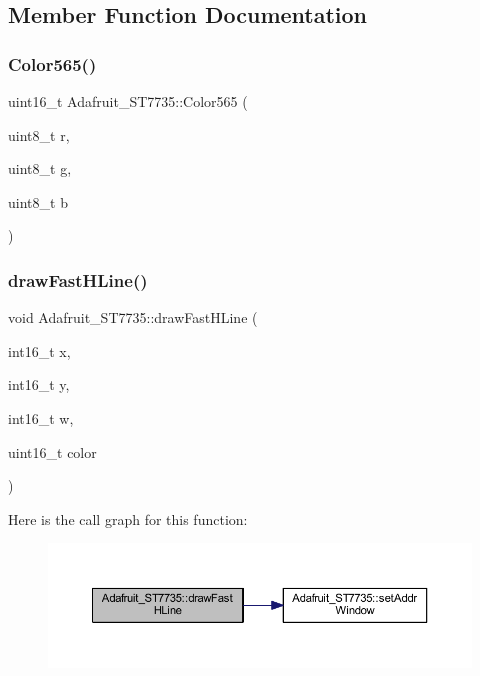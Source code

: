 \subsection{Member Function Documentation}
\mbox{\label{class_adafruit___s_t7735_aef9c4f90acb18082a51b18490feb3c0b}} 
\subsubsection{\texorpdfstring{Color565()}{Color565()}}
{\footnotesize\ttfamily uint16\+\_\+t Adafruit\+\_\+\+S\+T7735\+::\+Color565 (\begin{DoxyParamCaption}\item[{uint8\+\_\+t}]{r,  }\item[{uint8\+\_\+t}]{g,  }\item[{uint8\+\_\+t}]{b }\end{DoxyParamCaption})}

\mbox{\label{class_adafruit___s_t7735_ab2b8eb320bd19305c09b35be6d55d37e}} 
\subsubsection{\texorpdfstring{draw\+Fast\+H\+Line()}{drawFastHLine()}}
{\footnotesize\ttfamily void Adafruit\+\_\+\+S\+T7735\+::draw\+Fast\+H\+Line (\begin{DoxyParamCaption}\item[{int16\+\_\+t}]{x,  }\item[{int16\+\_\+t}]{y,  }\item[{int16\+\_\+t}]{w,  }\item[{uint16\+\_\+t}]{color }\end{DoxyParamCaption})}

Here is the call graph for this function\+:\nopagebreak
\begin{figure}[H]
\begin{center}
\leavevmode
\includegraphics[width=350pt]{class_adafruit___s_t7735_ab2b8eb320bd19305c09b35be6d55d37e_cgraph}
\end{center}
\end{figure}
\mbox{\label{class_adafruit___s_t7735_a38de2e08911db493eb243ce2691e9c3a}} 
